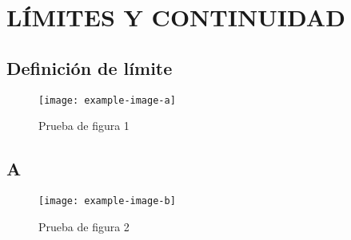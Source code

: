 \chapter{LÍMITES Y CONTINUIDAD}
\printchaptertableofcontents

\section{Definición de límite}

\lipsum[1-3]

\begin{figure}[h!]
    \centering
    \texttt{[image: example-image-a]}
    \caption{Prueba de figura 1}
\end{figure}

\section{A}

\marginElement{\justify\lipsum[1-2]}

\lipsum[1-6]

\begin{figure}[h!]
    \centering
    \texttt{[image: example-image-b]}
    \caption{Prueba de figura 2}
\end{figure}